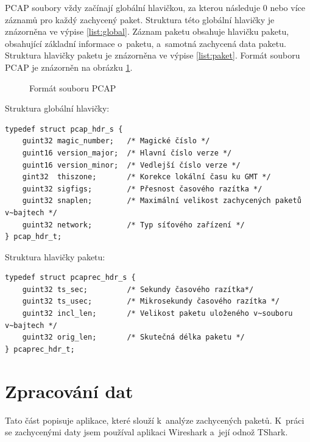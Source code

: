 PCAP soubory vždy začínají globální hlavičkou, za kterou následuje 0 nebo více záznamů pro každý zachycený paket. Struktura této globální hlavičky je znázorněna ve výpise \ref{list:global}. Záznam paketu obsahuje hlavičku paketu, obsahující základní informace o~paketu, a~samotná zachycená data paketu. Struktura hlavičky paketu je znázorněna ve výpise \ref{list:paket}. Formát souboru PCAP je znázorněn na obrázku \ref{img:pcap}.

\begin{figure}[H]
    \centering
    \caption{Formát souboru PCAP}
    \label{img:pcap}
\end{figure}

Struktura globální hlavičky:

\begin{lstlisting}[style=npl, caption={Struktura globální hlavičky}, label={list:global}]
typedef struct pcap_hdr_s {
    guint32 magic_number;   /* Magické číslo */
    guint16 version_major;  /* Hlavní číslo verze */
    guint16 version_minor;  /* Vedlejší číslo verze */
    gint32  thiszone;       /* Korekce lokální času ku GMT */
    guint32 sigfigs;        /* Přesnost časového razítka */
    guint32 snaplen;        /* Maximální velikost zachycených paketů v~bajtech */
    guint32 network;        /* Typ síťového zařízení */
} pcap_hdr_t;
\end{lstlisting}

Struktura hlavičky paketu:

\begin{lstlisting}[style=npl, caption={Struktura hlavičky paketu}, label={list:paket}]
typedef struct pcaprec_hdr_s {
    guint32 ts_sec;         /* Sekundy časového razítka*/
    guint32 ts_usec;        /* Mikrosekundy časového razítka */
    guint32 incl_len;       /* Velikost paketu uloženého v~souboru v~bajtech */
    guint32 orig_len;       /* Skutečná délka paketu */
} pcaprec_hdr_t; 
\end{lstlisting}

\section{Zpracování dat}
Tato část popisuje aplikace, které slouží k~analýze zachycených paketů. K~práci se zachycenými daty jsem používal aplikaci Wireshark a~její odnož TShark. 

